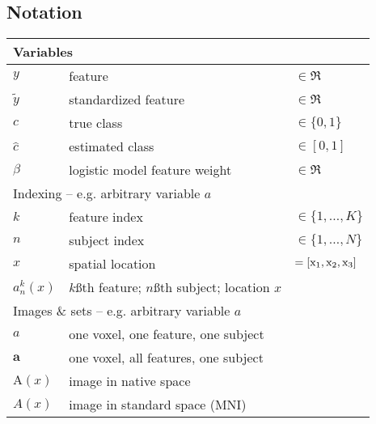 \begin{singlespacing}
\subsection*{Notation}
\begin{table}[H]
  \begin{tabular}{lll}
    \hline
    \multicolumn{3}{l}{Variables}                                                                       \\ \hline
    $y$                   & feature                                              & $\in\Re$             \\
    $\tilde{y}$           & standardized feature                                 & $\in\Re$             \\
    $c$                   & true class                                           & $\in\{0,1\}$         \\
    $\hat{c}$             & estimated class                                      & $\in[0,1]$           \\
    $\beta$               & logistic model feature weight                        & $\in\Re$             \\ \hline
    \multicolumn{3}{l}{Indexing -- e.g. arbitrary variable $a$}                                         \\ \hline
    $k$                   & feature index                                        & $\in \{1,\dots,K\}$  \\
    $n$                   & subject index                                        & $\in \{1,\dots,N\}$  \\
    $x$                   & spatial location                                     & $= [\mathrm{x}_1,\mathrm{x}_2,\mathrm{x}_3]$           \\
    $a_n^k(x)$            & $k$\ss{th} feature; $n$\ss{th} subject; location $x$ &                      \\ \hline
    \multicolumn{3}{l}{Images \& sets -- e.g. arbitrary variable $a$}                                   \\ \hline
    $a$                   & one voxel, one feature, one subject                  &                      \\
    $\bm{a}$              & one voxel, all features, one subject                 &                      \\
    $\mathrm{A}(x)$       & image in native space                                &                      \\
    $A(x)$                & image in standard space (MNI)                        &                      \\

\end{tabular}
\end{table}
\end{singlespacing}
